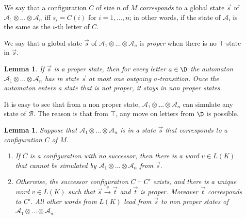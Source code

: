 \documentclass{LMCS}
\theoremstyle{plain}\newtheorem{remark}{Remark}
\theoremstyle{plain}\newtheorem{lemma}[thm]{Lemma}
\renewcommand{\Aa}{\mathcal{A}}
\renewcommand{\Bb}{\mathcal{B}}
\newcommand{\vecs}{\vec s}
\newcommand{\vect}{\vec t}
\newcommand{\vAa}{\Aa_1\otimes\dots\otimes\Aa_n}
\newcommand{\trans}[1]{\stackrel{#1}{\longrightarrow}}
\begin{document}
\begin{defi}
  We say that a configuration $C$ of size $n$ of $M$ \emph{corresponds} to a
  global state $\vecs$ of $\vAa$ iff $s_i=C(i)$ for $i=1,\dots,n$; in
  other words, if the state of $\Aa_i$ is the same as the $i$-th letter of
  $C$.
\end{defi}

\begin{defi}
  We say that a global state $\vecs$ of $\vAa$ is \emph{proper} when
  there is no $\top$-state in $\vecs$. 
\end{defi}

\begin{lemma}
  If $\vecs$ is a proper state, then for every letter $a\in\D$ the
  automaton $\vAa$ has in state $\vecs$ at most one outgoing
  $a$-transition.  Once the automaton enters a state that is not
  proper, it stays in non proper states.
\end{lemma}
 It is easy to see that from a non proper state, $\vAa$ can simulate 
any state of $\Bb$. The reason is that from $\top$,
 any move on letters from $\D$ is possible.


\begin{lemma} \label{l:step}
Suppose that $\vAa$ is in a state $\vecs$ that corresponds to a
  configuration $C$ of $M$.
  \begin{enumerate}[$\bullet$]
  \item If $C$ is a configuration with no successor,
    then there is a word $v\in L(K)$ that cannot be simulated by
    $\vAa$ from $\vecs$.

  \item Otherwise, the successor configuration $C\vdash C'$ exists,
    and there is a unique word $v\in L(K)$ such that
    $\vecs\trans{v}\vect$ and $\vect$ is proper. Moreover $\vect$
    corresponds to $C'$. All other words from $L(K)$ lead from $\vecs$
    to non
    proper states of $\vAa$. 
  \end{enumerate}
\end{lemma}
\end{document}
